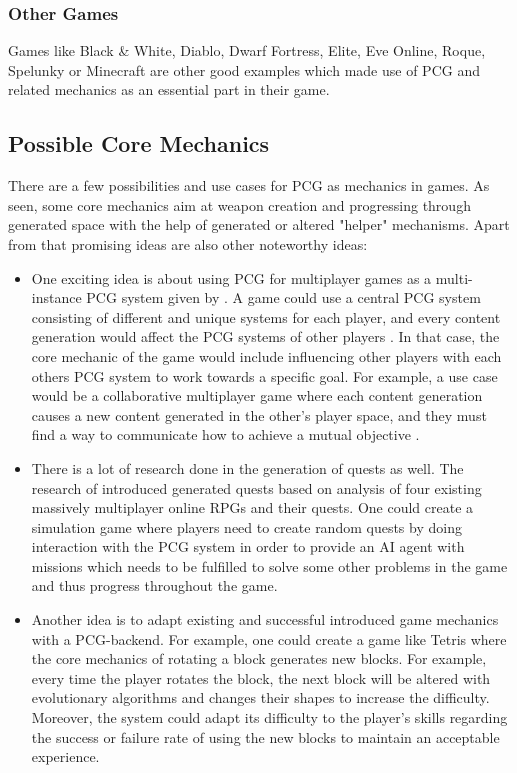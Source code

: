 \documentclass[MGS,Master,english]{twbook}%
\begin{document}
\subsubsection{Other Games}
Games like Black \& White, Diablo, Dwarf Fortress, Elite, Eve Online, Roque, Spelunky or Minecraft are other good examples which made use of \ac{PCG} and related mechanics as an essential part in their game.

\subsection{Possible Core Mechanics}
There are a few possibilities and use cases for \ac{PCG} as mechanics in games. As seen, some core mechanics aim at weapon creation and progressing through generated space with the help of generated or altered "helper" mechanisms. Apart from that promising ideas are also other noteworthy ideas:
\begin{itemize}
	\item One exciting idea is about using \ac{PCG} for multiplayer games as a multi-instance \ac{PCG} system given by \citep{pcg::futureOfPcgInGames}. A game could use a central \ac{PCG} system consisting of different and unique systems for each player, and every content generation would affect the \ac{PCG} systems of other players \cite{pcg::futureOfPcgInGames}.  In that case, the core mechanic of the game would include influencing other players with each others \ac{PCG} system to work towards a specific goal. For example, a use case would be a collaborative multiplayer game where each content generation causes a new content generated in the other’s player space, and they must find a way to communicate how to achieve a mutual objective \cite{pcg::futureOfPcgInGames}. 
	\item There is a lot of research done in the generation of quests as well. The research of \citep{pcg::questGenerator} introduced generated quests based on analysis of four existing massively multiplayer online \acp{RPG} and their quests. One could create a simulation game where players need to create random quests by doing interaction with the \ac{PCG} system in order to provide an \ac{AI} agent with missions which needs to be fulfilled to solve some other problems in the game and thus progress throughout the game.
	\item Another idea is to adapt existing and successful introduced game mechanics with a \ac{PCG}-backend. For example, one could create a game like Tetris where the core mechanics of rotating a block generates new blocks. For example, every time the player rotates the block, the next block will be altered with evolutionary algorithms and changes their shapes to increase the difficulty. Moreover, the system could adapt its difficulty to the player's skills regarding the success or failure rate of using the new blocks to maintain an acceptable experience.
\end{itemize} 
\end{document}
